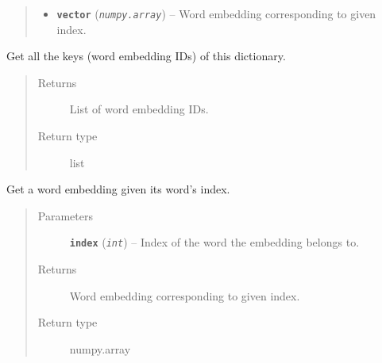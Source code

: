 \documentclass[letterpaper,10pt,english]{sphinxmanual}
\begin{document}
\begin{fulllineitems}
\begin{fulllineitems}
\begin{quote}
\begin{description}
\begin{itemize}
\item {} 
\textbf{\texttt{vector}} (\emph{\texttt{numpy.array}}) -- Word embedding corresponding to given index.

\end{itemize}

\end{description}\end{quote}

\end{fulllineitems}


\begin{fulllineitems}
\label{src.mapping:src.mapping.mapthreading.VectorDict.get_keys}
Get all the keys (word embedding IDs) of this dictionary.
\begin{quote}\begin{description}
\item[{Returns}] \leavevmode
List of word embedding IDs.

\item[{Return type}] \leavevmode
list

\end{description}\end{quote}

\end{fulllineitems}


\begin{fulllineitems}
\label{src.mapping:src.mapping.mapthreading.VectorDict.get_vector}
Get a word embedding given its word's index.
\begin{quote}\begin{description}
\item[{Parameters}] \leavevmode
\textbf{\texttt{index}} (\emph{\texttt{int}}) -- Index of the word the embedding belongs to.

\item[{Returns}] \leavevmode
Word embedding corresponding to given index.

\item[{Return type}] \leavevmode
numpy.array

\end{description}\end{quote}

\end{fulllineitems}


\end{fulllineitems}
\end{document}
